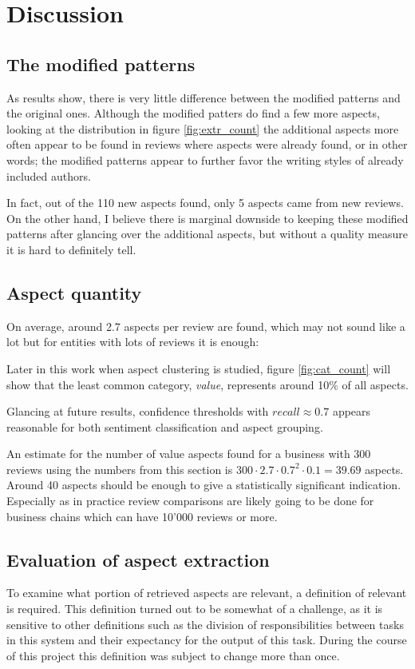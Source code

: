 \documentclass[a4paper,11pt]{kth-mag}
\begin{document}
\section{Discussion}
\subsection{The modified patterns}
As results show, there is very little difference between the modified patterns and
the original ones. Although the modified patters do find a few more aspects, looking
at the distribution in figure \ref{fig:extr_count} the additional aspects more often
appear to be found in reviews where aspects were already found, or in other words;
the modified patterns appear to further favor the writing styles of already included authors.

In fact, out of the 110 new aspects found, only 5 aspects came from new reviews.
On the other hand, I believe there is marginal downside to keeping these modified
patterns after glancing over the additional aspects, but without a quality measure
it is hard to definitely tell. 

\subsection{Aspect quantity}
On average, around 2.7 aspects per review are found, which may not sound like a lot 
but for entities with lots of reviews it is enough:

Later in this work when aspect clustering is studied, figure \ref{fig:cat_count}
will show that the least common category, \emph{value}, represents around
10\% of all aspects.

Glancing at future results, confidence thresholds with $recall\approx 0.7$
appears reasonable for both sentiment classification and aspect grouping.

An estimate for the number of value aspects found for a business with 300 reviews
using the numbers from this section is $300 \cdot 2.7 \cdot 0.7^2 \cdot 0.1 = 39.69$ aspects.
Around 40 aspects should be enough to give a statistically significant indication.
Especially as in practice review comparisons are likely going to be done for
business chains which can have 10'000 reviews or more.

\subsection{Evaluation of aspect extraction}
To examine what portion of retrieved aspects are relevant, a definition of relevant
is required. This definition turned out to be somewhat of a challenge, as it is sensitive
to other definitions such as the division of responsibilities between tasks
in this system and their expectancy for the output of this task.
During the course of this project this definition was subject to change more than once.
\end{document}
